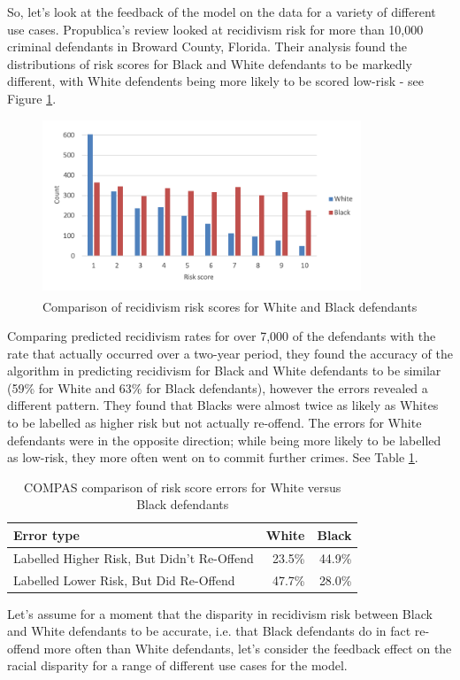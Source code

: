 So, let's look at the feedback of the model on the data for a variety of different use cases. Propublica's review looked at recidivism risk for more than 10,000 criminal defendants in Broward County, Florida\cite{ProPub3}. Their analysis found the distributions of risk scores for Black and White defendants to be markedly different, with White defendents being more likely to be scored low-risk - see Figure \ref{fig_COMPAS}.
%
\begin{figure}[h!]
\centering
\includegraphics[width=0.85\textwidth]{02_EthicalDevelopment/figures/Fig_Propublica.png}
\caption[Comparison of recidivism risk scores for White and Black defendants.]{Comparison of recidivism risk scores for White and Black defendants\textsuperscript{\cite{ProPub3}}}
\label{fig_COMPAS}
\end{figure}

Comparing predicted recidivism rates for over 7,000 of the defendants with the rate that actually occurred over a two-year period, they found the accuracy of the algorithm in predicting recidivism for Black and White defendants to be similar (59\% for White and 63\% for Black defendants), however the errors revealed a different pattern. They found that Blacks were almost twice as likely as Whites to be labelled as higher risk but not actually re-offend. The errors for White defendants were in the opposite direction; while being more likely to be labelled as low-risk, they more often went on to commit further crimes. See Table \ref{tab_COMPAS}.
%
\begin{table}[h!]
\centering
\caption{COMPAS comparison of risk score errors for White versus Black defendants}
\label{tab_COMPAS}
\vspace{10pt}
\begin{tabular}{|l|r|r|}
\hline
Error type                                 & White  & Black  \\
\hline
\hline
Labelled Higher Risk, But Didn’t Re-Offend & 23.5\% & 44.9\% \\
Labelled Lower Risk, But Did Re-Offend     & 47.7\% & 28.0\% \\
\hline
\end{tabular}
\end{table}
%
Let's assume for a moment that the disparity in recidivism risk between Black and White defendants to be accurate, i.e. that Black defendants do in fact re-offend more often than White defendants, let's consider the feedback effect on the racial disparity for a range of different use cases for the model.

